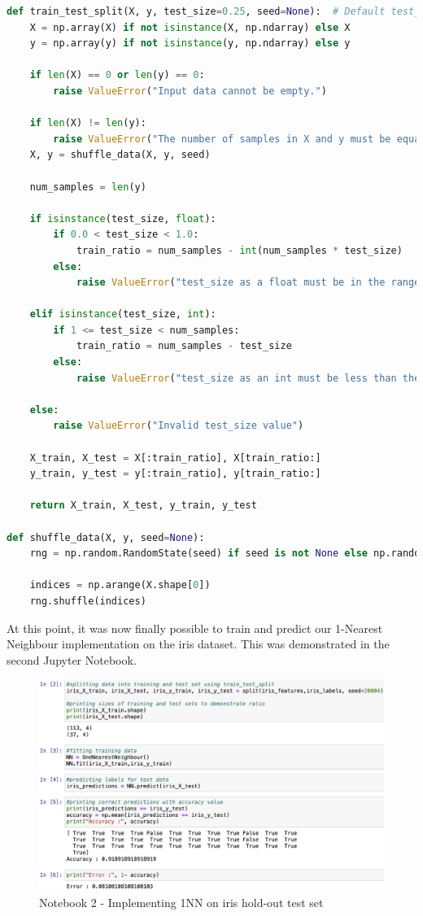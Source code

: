 \documentclass[letterpaper,10pt]{article}
\begin{document}
\begin{lstlisting}[language=Python, caption=train\_test\_split.py]
def train_test_split(X, y, test_size=0.25, seed=None):  # Default test_size is now 0.25
    X = np.array(X) if not isinstance(X, np.ndarray) else X
    y = np.array(y) if not isinstance(y, np.ndarray) else y
    
    if len(X) == 0 or len(y) == 0:
        raise ValueError("Input data cannot be empty.")

    if len(X) != len(y):
        raise ValueError("The number of samples in X and y must be equal.")
    X, y = shuffle_data(X, y, seed)

    num_samples = len(y)
    
    if isinstance(test_size, float):
        if 0.0 < test_size < 1.0:
            train_ratio = num_samples - int(num_samples * test_size)
        else:
            raise ValueError("test_size as a float must be in the range (0.0, 1.0)")

    elif isinstance(test_size, int):
        if 1 <= test_size < num_samples:
            train_ratio = num_samples - test_size
        else:
            raise ValueError("test_size as an int must be less than the number of samples")

    else:
        raise ValueError("Invalid test_size value")

    X_train, X_test = X[:train_ratio], X[train_ratio:]
    y_train, y_test = y[:train_ratio], y[train_ratio:]

    return X_train, X_test, y_train, y_test

def shuffle_data(X, y, seed=None):
    rng = np.random.RandomState(seed) if seed is not None else np.random

    indices = np.arange(X.shape[0])
    rng.shuffle(indices)
\end{lstlisting}

\vspace{20pt}
At this point, it was now finally possible to train and predict our 1-Nearest Neighbour implementation on the iris dataset. This was demonstrated in the second Jupyter Notebook. \par


\begin{figure}[ht]
    \centering
    \includegraphics[width=1.25\textwidth]{1NNsplitjupy.png}
    \caption{Notebook 2 - Implementing 1NN on iris hold-out test set }
    \label{fig:1nnsplitjupy}
\end{figure}
\end{document}

